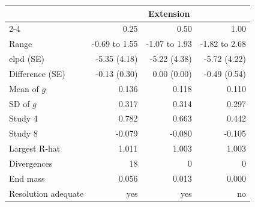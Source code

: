 \begin{tabular*}{\linewidth}{@{\extracolsep{\fill}}lrrr@{}}
\toprule
 & \multicolumn{3}{c}{Extension} \\
\cmidrule(l){2-4}
 & 0.25 & 0.50 & 1.00 \\
\midrule
Range & -0.69 to 1.55 & -1.07 to 1.93 & -1.82 to 2.68 \\
\addlinespace
elpd (SE) & -5.35 (4.18) & -5.22 (4.38) & -5.72 (4.22) \\
Difference (SE) & -0.13 (0.30) & 0.00 (0.00) & -0.49 (0.54) \\
\addlinespace
Mean of $g$ & 0.136 & 0.118 & 0.110 \\
SD of $g$ & 0.317 & 0.314 & 0.297 \\
Study 4 & 0.782 & 0.663 & 0.442 \\
Study 8 & -0.079 & -0.080 & -0.105 \\
\addlinespace
Largest R-hat & 1.011 & 1.003 & 1.003 \\
Divergences & 18 & 0 & 0 \\
End mass & 0.056 & 0.013 & 0.000 \\
Resolution adequate & yes & yes & no \\
\bottomrule
\end{tabular*}
